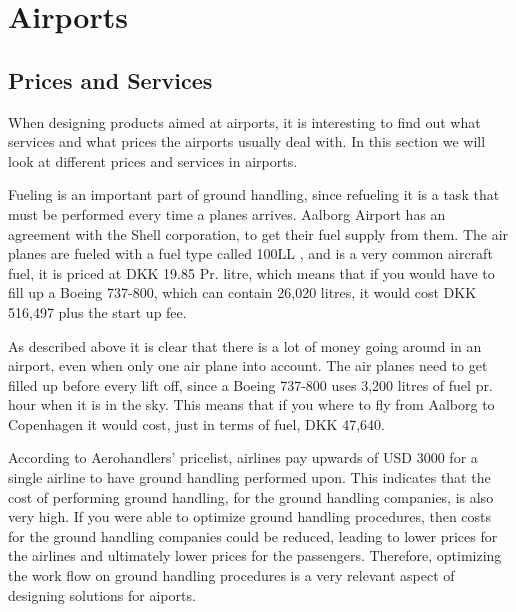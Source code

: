 \chapter{Airports}
\section{Prices and Services}
When designing products aimed at airports, it is interesting to find out what services and what prices the airports usually deal with. In this section we will look at different prices and services in airports.


Fueling is an important part of ground handling, since refueling it is a task that must be performed every time a planes arrives. Aalborg Airport has an agreement with the Shell corporation, to get their fuel supply from them. The air planes are fueled with a fuel type called 100LL \cite{iaopa_fuelprices}, and is a very common aircraft fuel, it is priced at DKK 19.85 Pr. litre, which means that if you would have to fill up a Boeing 737-800, which can contain 26,020 litres\cite{737_specs}, it would cost DKK 516,497 plus the start up fee.

As described above it is clear that there is a lot of money going around in an airport, even when only one air plane into account. The air planes need to get filled up before every lift off, since a Boeing 737-800 uses 3,200 litres of fuel pr. hour when it is in the sky. This means that if you where to fly from Aalborg to Copenhagen it would cost, just in terms of fuel, DKK 47,640.

According to Aerohandlers' pricelist\cite{PaS_AeroHandlers}, airlines pay upwards of USD 3000 for a single airline to have ground handling performed upon. This indicates that the cost of performing ground handling, for the ground handling companies, is also very high. If you were able to optimize ground handling procedures, then costs for the ground handling companies could be reduced, leading to lower prices for the airlines and ultimately lower prices for the passengers. Therefore, optimizing the work flow on ground handling procedures is a very relevant aspect of designing solutions for aiports.